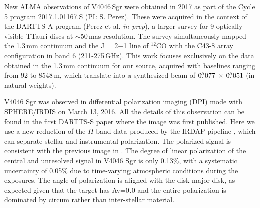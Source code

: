 \documentclass[letters,usenatbib,times]{mnras}
\begin{document}

New ALMA observations of V4046\,Sgr were obtained in 2017 as part of the Cycle 5 program 2017.1.01167.S (PI: S. Perez). These were acquired in the context of the DARTTS-A program (Perez et al. {\em in prep}), a larger survey for 9 optically visible TTauri discs at $\sim$50\,mas resolution. The survey simultaneously mapped the 1.3\,mm continuum and the J = 2$-$1 line of $^{12}$CO with the C43-8 array configuration in band 6 (211-275\,GHz). This work focuses exclusively on the data obtained in the 1.3\,mm continuum for our source, acquired with baselines ranging from 92 to 8548\,m, which translate into a synthesized beam of $0\hbox{$.\!\!^{\prime\prime}$}077 \,\times \, 0\hbox{$.\!\!^{\prime\prime}$}051$ (in natural weights).

V4046 Sgr was observed in differential polarization imaging (DPI) mode with SPHERE/IRDIS on March 13, 2016. All the details of this observation can be found in the first DARTTS-S paper \citep{Avenhaus_2018} where the image was first published. Here we use a new reduction of the $H$ band data produced by the IRDAP pipeline \citep{2020A&A...633A..64V}, which can separate stellar and instrumental polarization. The polarized signal is consistent with the previous image in \citet{Avenhaus_2018}. The degree of linear polarization of the central and unresolved signal in V4046 Sgr is only 0.13\%, with a systematic uncertainty of 0.05\% due to time-varying atmospheric conditions during the exposures. The angle of polarization is aligned with the disk major disk, as expected given that the target has Av=0.0 \citep{2016ApJ...828...69M} and the entire polarization is dominated by circum rather than inter-stellar material. 
\end{document}
